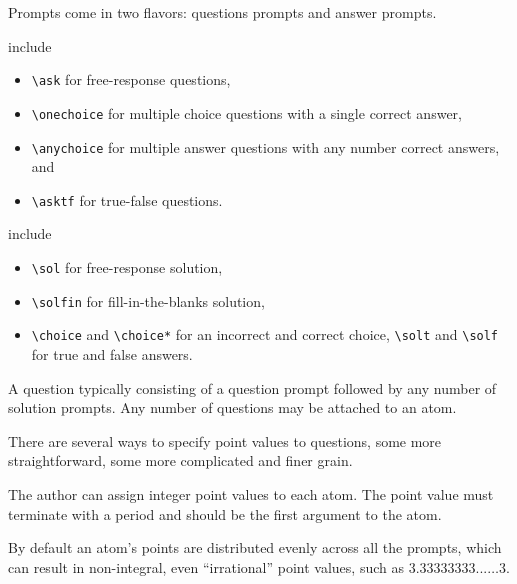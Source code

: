 \begin{cluster}
\label{grp:grm:quiz::prompts}

\begin{gram}[Prompts]
\label{grm:quiz::prompts}
Prompts come in two flavors: questions prompts and answer prompts.

  include 
\begin{itemize}
\item \lstinline`\ask` for free-response questions, 
\item \lstinline`\onechoice` for multiple choice questions with a single correct answer, 
\item \lstinline`\anychoice` for multiple answer questions with any number correct answers, and 
\item \lstinline`\asktf` for true-false questions.
\end{itemize}

  include 
\begin{itemize}

\item \lstinline`\sol` for free-response solution, 
\item \lstinline`\solfin` for fill-in-the-blanks solution, 
\item \lstinline`\choice` and \lstinline`\choice*` for an incorrect and correct choice, 
\lstinline`\solt` and \lstinline`\solf`   for true and false answers.
\end{itemize}

A question typically consisting of a question prompt followed by any
number of solution prompts.  
Any number of questions may be attached  to an atom.

\end{gram}
\end{cluster}

\begin{cluster}
\label{grp:grm:quiz::point-values}

\begin{gram}
\label{grm:quiz::point-values}
There are several ways to specify point values to questions, some more
straightforward, some more complicated and finer grain.

The author can assign integer point values to each atom. 
The point value must terminate with a period and should be the first argument to the atom.

By default an atom's points are distributed evenly across all the
prompts, which can result in non-integral, even ``irrational'' point
values, such as $3.33333333...\ldots 3$.  

\end{gram}
\end{cluster}

